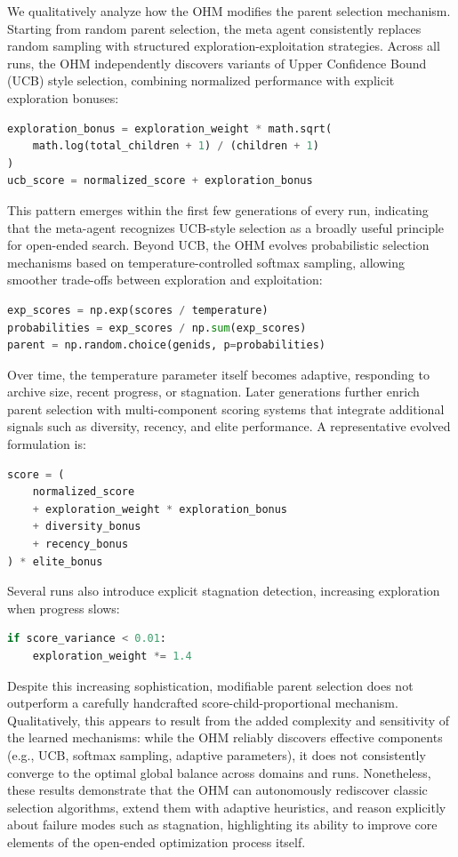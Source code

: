 \documentclass[]{fairmeta}
\begin{document}
We qualitatively analyze how the OHM modifies the parent selection mechanism. Starting from random parent selection, the meta agent consistently replaces random sampling with structured exploration-exploitation strategies. Across all runs, the OHM independently discovers variants of Upper Confidence Bound (UCB) style selection, combining normalized performance with explicit exploration bonuses:
\begin{lstlisting}[language=Python]
exploration_bonus = exploration_weight * math.sqrt(
    math.log(total_children + 1) / (children + 1)
)
ucb_score = normalized_score + exploration_bonus
\end{lstlisting}
This pattern emerges within the first few generations of every run, indicating that the meta-agent recognizes UCB-style selection as a broadly useful principle for open-ended search. Beyond UCB, the OHM evolves probabilistic selection mechanisms based on temperature-controlled softmax sampling, allowing smoother trade-offs between exploration and exploitation:
\begin{lstlisting}[language=Python]
exp_scores = np.exp(scores / temperature)
probabilities = exp_scores / np.sum(exp_scores)
parent = np.random.choice(genids, p=probabilities)
\end{lstlisting}
Over time, the temperature parameter itself becomes adaptive, responding to archive size, recent progress, or stagnation. Later generations further enrich parent selection with multi-component scoring systems that integrate additional signals such as diversity, recency, and elite performance. A representative evolved formulation is:
\begin{lstlisting}[language=Python]
score = (
    normalized_score
    + exploration_weight * exploration_bonus
    + diversity_bonus
    + recency_bonus
) * elite_bonus
\end{lstlisting}
Several runs also introduce explicit stagnation detection, increasing exploration when progress slows:
\begin{lstlisting}[language=Python]
if score_variance < 0.01:
    exploration_weight *= 1.4
\end{lstlisting}

Despite this increasing sophistication, modifiable parent selection does not outperform a carefully handcrafted score-child-proportional mechanism. Qualitatively, this appears to result from the added complexity and sensitivity of the learned mechanisms: while the OHM reliably discovers effective components (e.g., UCB, softmax sampling, adaptive parameters), it does not consistently converge to the optimal global balance across domains and runs. Nonetheless, these results demonstrate that the OHM can autonomously rediscover classic selection algorithms, extend them with adaptive heuristics, and reason explicitly about failure modes such as stagnation, highlighting its ability to improve core elements of the open-ended optimization process itself.
\end{document}

